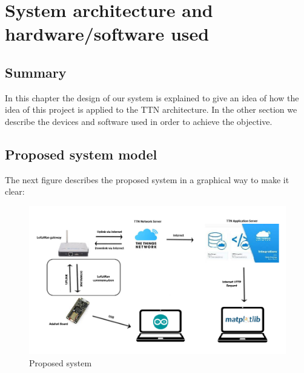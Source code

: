 
\chapter{System architecture and hardware/software used}
\label{chap:third}
\ifpdf
    \graphicspath{{Chapter3/Figures/PNG/}{Chapter3/Figures/PDF/}{Chapter3/Figures/}}
\else
    \graphicspath{{Chapter3/Figures/EPS/}{Chapter3/Figures/}}
\fi


\section*{Summary}
In this chapter the design of our system is explained to give an
idea of how the idea of this project is applied to the TTN architecture.
In the other section we describe the devices and software used in order
to achieve the objective.

\section{Proposed system model}
\label{sec:s-system}
The next figure describes the proposed system in a graphical way to make it clear:
\begin{figure}[htbp]
    \includegraphics[width=\linewidth]{System.png}
    \caption{Proposed system}
\end{figure}

